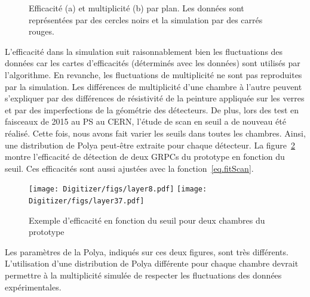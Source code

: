 \begin{figure}[!ht]
  \caption{Efficacité (a) et multiplicité (b) par plan. Les données sont représentées par des cercles noirs et la simulation par des carrés rouges.\label{fig.eff_mul_layer}}
\end{figure}
L'efficacité dans la simulation suit raisonnablement bien les fluctuations des données car les cartes d'efficacités (déterminés avec les données) sont utilisés par l'algorithme. En revanche, les fluctuations de multiplicité ne sont pas reproduites par la simulation. Les différences de multiplicité d'une chambre à l'autre peuvent s'expliquer par des différences de résistivité de la peinture appliquée sur les verres et par des imperfections de la géométrie des détecteurs. De plus, lors des test en faisceaux de 2015 au PS au CERN, l'étude de scan en seuil a de nouveau été réalisé. Cette fois, nous avons fait varier les seuils dans toutes les chambres. Ainsi, une distribution de Polya peut-être extraite pour chaque détecteur. La figure~\ref{fig.polya_ps_2015} montre l'efficacité de détection de deux GRPCs du prototype en fonction du seuil. Ces efficacités sont aussi ajustées avec la fonction~\ref{eq.fitScan}.
\begin{figure}[!ht]
  \texttt{[image: Digitizer/figs/layer8.pdf]}
  \texttt{[image: Digitizer/figs/layer37.pdf]}
  \caption{Exemple d'efficacité en fonction du seuil pour deux chambres du prototype}
  \label{fig.polya_ps_2015}
\end{figure}
Les paramètres de la Polya, indiqués sur ces deux figures, sont très différents. L'utilisation d'une distribution de Polya différente pour chaque chambre devrait permettre à la multiplicité simulée de respecter les fluctuations des données expérimentales.

